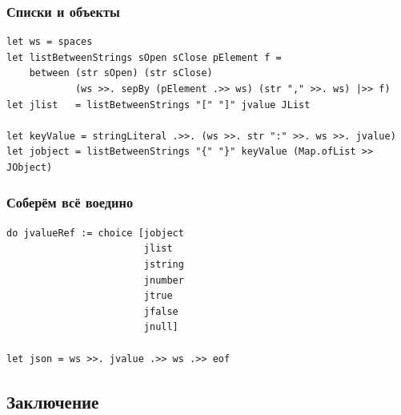 \documentclass[xetex,mathserif,serif]{beamer}
\begin{document}
    \begin{frame}[fragile]
        \frametitle{Списки и объекты}
        \begin{verbatim}
let ws = spaces
let listBetweenStrings sOpen sClose pElement f =
    between (str sOpen) (str sClose)
            (ws >>. sepBy (pElement .>> ws) (str "," >>. ws) |>> f)
let jlist   = listBetweenStrings "[" "]" jvalue JList

let keyValue = stringLiteral .>>. (ws >>. str ":" >>. ws >>. jvalue)
let jobject = listBetweenStrings "{" "}" keyValue (Map.ofList >> JObject)
        \end{verbatim}
    \end{frame}

    \begin{frame}[fragile]
        \frametitle{Соберём всё воедино}
        \begin{verbatim}
do jvalueRef := choice [jobject
                        jlist
                        jstring
                        jnumber
                        jtrue
                        jfalse
                        jnull]

let json = ws >>. jvalue .>> ws .>> eof
        \end{verbatim}
    \end{frame}

    \subsection{Заключение}
\end{document}
